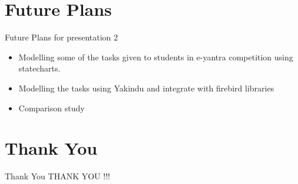 \documentclass[10pt, a4paper]{beamer}
\begin{document}
\section{Future Plans}
\begin{frame}{Future Plans for presentation 2}
	\begin{itemize}
		\item Modelling some of the tasks given to students in e-yantra
		competition using statecharts.
		\item Modelling the tasks using Yakindu and integrate with
		firebird libraries
		\item Comparison study
	\end{itemize}
\end{frame}


\section{Thank You}
\begin{frame}{Thank You}
	\centering THANK YOU !!!
\end{frame}
\end{document}
